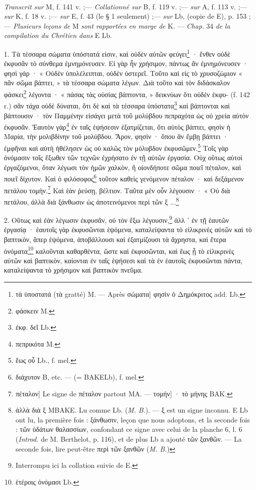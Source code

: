 \documentclass[a4paper, 11pt, oneside, polutonikogreek, french]{article}
\begin{document}
\paragraph{}
\emph{Transcrit sur} M, f. 141 v. ;--- \emph{Collationné sur} B, f. 119 v. ;--- \emph{sur} A, f. 113 v. ;--- \emph{sur} K, f. 18 v. ;--- \emph{sur} E, f. 43 (le § 1 seulement) ;--- \emph{sur} Lb, (copie de E), p. 153 ;--- \emph{Plusieurs leçons de} M \emph{sont rapportées en marge de} K. --- \emph{Chap.} 34 \emph{de la compilation du Chrétien dans} E Lb.

\bigskip

1. Τὰ τέσσαρα σώματα ὑπόστατά εἰσιν, καὶ οὐδὲν αὐτῶν φεύγει\footnote{τὰ ὑποστατά (τὰ gratté) M. --- Après σώματα] φησὶν ὁ Δημόκριτος add. Lb.} · ἔνθεν οὐδὲ ἐκφυσᾶν τὸ σύνθεμα ἐμνημόνευσεν. Εἰ γὰρ ἦν χρήσιμον, πάντως ἂν ἐμνημόνευσεν · φησὶ γάρ · « Οὐδὲν ὑπολέλειπται, οὐδὲν ὑστερεῖ. Τοῦτο καὶ εἰς τὸ χρυσοζώμιον « πᾶν σῶμα βάπτει, » τὰ τέσσαρα σώματα λέγων. Διὰ τοῦτο καὶ τὸν διδάσκαλον φάσκει\footnote{φάσκειν M.} λέγοντα · « πάσας τὰς οὐσίας βάπτοντα, » δεικνύων ὅτι οὐδὲν ἐκφυ- (f. 142 r.) σᾶν τάχα οὐδὲ δύναται, ὅτι δὲ καὶ τὰ τέσσαρα ὑπόστατα\footnote{ἐκφ. δεῖ Lb.} καὶ βάπτονται καὶ βάπτουσιν · τὸν Παμμένην εἰσάγει μετὰ τοῦ μολύβδου πεπραχότα ὡς οὐ χρεία αὐτὸν ἐκφυσᾶν. Ἑαυτὸν γὰρ\footnote{πεπρικότα M.} ἐν ταῖς ἑψήσεσιν ἐξατμίζεται, ὅτι αὐτὸς βάπτει, φησὶν ἡ Μαρία, τὴν μολιβδίνην τοῦ μολύβδου. Ἄρον, φησίν · ὅπου ἂν ἔμβῃ βάπτει · ἐμφῆναι καὶ αὐτὴ ἠθέλησεν ὡς οὐ καλῶς τὸν μόλυβδον ἐκφυσῶμεν.\footnote{ἕως οὖ Lb., f. mel.} Τοῖς γὰρ ὀνόμασιν τοῖς ἔξωθεν τῶν τεχνῶν ἐχρήσατο ἐν τῇ αὐτῶν ἐργασία. Οὐχ οὕτως αὐτοὶ ἐργαζόμενοι, ὅταν λέγωσι τὸν ἡμῶν χαλκὸν, ἢ οἱονδήποτε σῶμα ποιεῖ πέταλον, καὶ ποιεῖ δίχυτον. Καὶ ὁ φιλόσοφος\footnote{διάχυτον B, etc. --- (= BAKELb), f. mel.} τοῦτον καθεὶς γενόμενον πέταλον · καὶ δεξάμενον πετάλου τομὴν.\footnote{πέταλον] Le signe de πέταλον partout MA. --- τομήν] · τὸ μήνης BAK.} Καὶ ἑὰν ῥεύσῃ, βέλτιον. Ταῦτα μὲν οὖν λέγουσιν · « Οὐ διὰ πετάλου, ἀλλὰ διὰ ξάνθωσιν ὡς ἀποτεινόμενοι περὶ τῶν ξ ...\footnote{ἀλλὰ διὰ ξ MBAKE. Lu comme Lb. (\emph{M. B.}). --- ξ est un signe inconnu. E Lb ont lu, la première fois : ξάνθωσιν, leçon que nous adoptons, et la seconde fois : τῶν ὑδάτων θαλασσίων, confondant ce signe avec celui de la planche 6, l. 6 (\emph{Introd.} de M. Berthelot, p. 116), et de plus Lb a ajouté τῶν ξανθῶν. --- La seconde fois, lire peut-être περὶ τῶν ξανθῶν (\emph{M. B.})}

2. Οὕτως καὶ ἐὰν λέγωσιν ἐκφυσᾶν, οὐ τὸν ἔξω λέγουσιν,\footnote{Interrompu ici la collation suivie de E.} ἀλλ ᾽ ἐν τῇ ἑαυτῶν ἐργασίᾳ · ἑαυτοῖς γὰρ ἐκφυσῶνται ἑψόμενα, καταλείψαντα τὸ εἰλικρινὲς αὐτῶν καὶ τὸ βαπτικὸν, ἅπερ ἑψόμενα, ἀποβάλλουσι καὶ ἐξατμίζουσι τὰ ἄχρηστα, καὶ ἕτερα ὀνόματα\footnote{ἑτέροις ὀνόμασι Lb.} καλοῦνται καθαρθέντα, ὥστε καὶ ἐκφυσῶνται, καὶ ἕως ᾖ τὸ εἰλικρινὲς αὐτῶν καὶ βαπτικὸν, καίονται ἐν ταῖς ἑψήσεσι καὶ τὰ ἐν ἑαυτοῖς ἐκφυσῶνται πάντα, καταλείψαντα τὸ χρήσιμον καὶ βαπτικὸν πνεῦμα.
\end{document}
